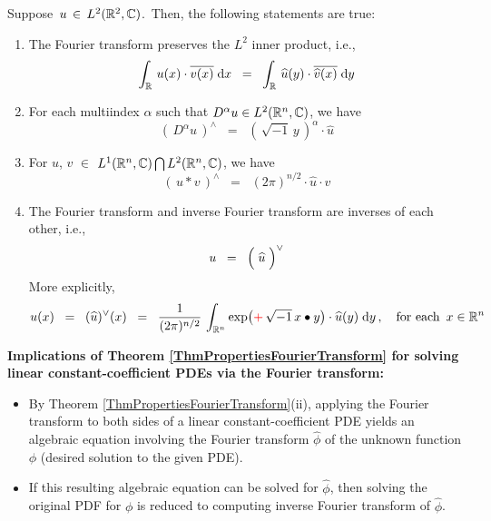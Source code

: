 \vskip 0.5cm
\begin{theorem}
\label{ThmPropertiesFourierTransform}
\mbox{}
\vskip 0.1cm
\noindent
Suppose \,$u \,\in\, L^{2}(\mathbb{R}^{2},\mathbb{C})$.\,
Then, the following statements are true:
\begin{enumerate}
\item
	The Fourier transform preserves the $L^{2}$ inner product, i.e.,
	\begin{equation*}
	\int_{\mathbb{R}}\, u(x) \cdot \overline{v(x)} \;\textnormal{d} x
	\;\; = \;\;
		\int_{\mathbb{R}}\, \widehat{u}(y) \cdot \overline{\widehat{v}(x)} \;\textnormal{d} y
	\end{equation*}
\item
	For each multiindex $\alpha$ such that $D^{\alpha}u \in L^{2}(\mathbb{R}^{n},\mathbb{C})$, we have
	\begin{equation*}
	\left(\,D^{\alpha}u\,\right)^{\wedge}
	\;\; = \;\;
		\left(\,\sqrt{-1}\,y\,\right)^{\alpha}\cdot \widehat{u}
	\end{equation*}
\item
	For $u$, $v$ $\in$ $L^{1}(\mathbb{R}^{n},\mathbb{C}) \bigcap L^{2}(\mathbb{R}^{n},\mathbb{C})$, we have
	\begin{equation*}
	\left(\,u * v\,\right)^{\wedge}
	\;\; = \;\;
		(2\pi)^{n/2} \cdot \widehat{u} \cdot \widehat{v}
	\end{equation*}
\item
	The Fourier transform and inverse Fourier transform are inverses of each other, i.e.,
	\begin{equation*}
	u \;\; = \;\; \left(\;\overset{{\color{white}.}}{\widehat{u}}\;\right)^{\vee}
	\end{equation*}
	More explicitly,
	\begin{equation*}
	u(x)
	\;\; = \;\;
		(\widehat{u})^{\vee}(x)
	\;\; = \;\;
		\dfrac{1}{(2\pi)^{n/2}}\,
		\int_{\Re^{n}}
			\exp\!\left({\color{red}+}\,\sqrt{-1}\, x \overset{{\color{white}.}}{\bullet} y\right) \cdot \widehat{u}(y)
			\;\d y\,,
	\quad
	\textnormal{for each \,$x \in \Re^{n}$}
	\end{equation*}
\end{enumerate}
\end{theorem}


\vskip0.5cm
\noindent
\textbf{Implications of Theorem \ref{ThmPropertiesFourierTransform} for solving linear constant-coefficient PDEs via the Fourier transform:}
\begin{itemize}
\item
	By Theorem \ref{ThmPropertiesFourierTransform}(ii), applying the Fourier transform
	to both sides of a linear constant-coefficient PDE yields an algebraic equation
	involving the Fourier transform $\widehat{\phi}$ of the unknown function $\phi$
	(desired solution to the given PDE).
\item
	If this resulting algebraic equation can be solved for $\widehat{\phi}$,
	then solving the original PDF for $\phi$ is reduced to computing
	inverse Fourier transform of $\widehat{\phi}$.
\end{itemize}

